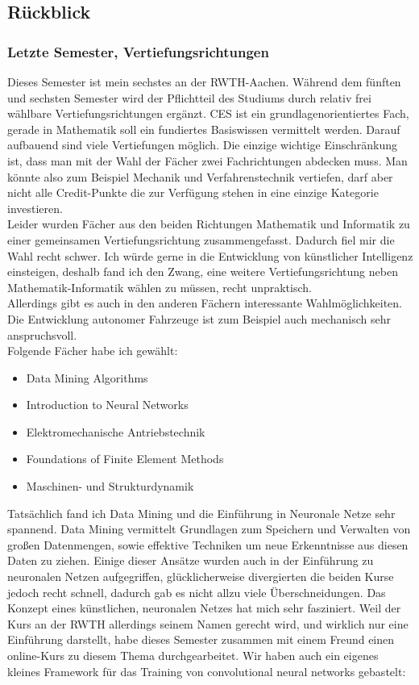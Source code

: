 \documentclass[12pt]{article}
\begin{document}
\begin{large}
\subsection*{Rückblick}
\subsubsection*{Letzte Semester, Vertiefungsrichtungen}
Dieses Semester ist mein sechstes an der RWTH-Aachen. Während dem fünften und sechsten Semester wird der Pflichtteil des Studiums durch relativ frei wählbare Vertiefungsrichtungen ergänzt. CES ist ein grundlagenorientiertes Fach, gerade in Mathematik soll ein fundiertes Basiswissen vermittelt werden. Darauf aufbauend sind viele Vertiefungen möglich. Die einzige wichtige Einschränkung ist, dass man mit der Wahl der Fächer zwei Fachrichtungen abdecken muss. Man könnte also zum Beispiel Mechanik und Verfahrenstechnik vertiefen, darf aber nicht alle Credit-Punkte die zur Verfügung stehen in eine einzige Kategorie investieren.\\
Leider wurden Fächer aus den beiden Richtungen Mathematik und Informatik zu einer gemeinsamen Vertiefungsrichtung zusammengefasst. Dadurch fiel mir die Wahl recht schwer.
Ich würde gerne in die Entwicklung von künstlicher Intelligenz einsteigen, deshalb fand ich den Zwang, eine weitere Vertiefungsrichtung neben Mathematik-Informatik wählen zu müssen, recht unpraktisch.\\
Allerdings gibt es auch in den anderen Fächern interessante Wahlmöglichkeiten. Die Entwicklung autonomer Fahrzeuge ist zum Beispiel auch mechanisch sehr anspruchsvoll.\\
Folgende Fächer habe ich gewählt:\\
\begin{itemize}
\item Data Mining Algorithms
\item Introduction to Neural Networks
\item Elektromechanische Antriebstechnik
\item Foundations of Finite Element Methods
\item Maschinen- und Strukturdynamik
\end{itemize}

Tatsächlich fand ich Data Mining und die Einführung in Neuronale Netze sehr spannend. Data Mining vermittelt Grundlagen zum Speichern und Verwalten von großen Datenmengen, sowie effektive Techniken um neue Erkenntnisse aus diesen Daten zu ziehen. Einige dieser Ansätze wurden auch in der Einführung zu neuronalen Netzen aufgegriffen, glücklicherweise divergierten die beiden Kurse jedoch recht schnell, dadurch gab es nicht allzu viele Überschneidungen. Das Konzept eines künstlichen, neuronalen Netzes hat mich sehr fasziniert. Weil der Kurs an der RWTH allerdings seinem Namen gerecht wird, und wirklich nur eine Einführung darstellt, habe dieses Semester zusammen mit einem Freund einen online-Kurs zu diesem Thema durchgearbeitet. Wir haben auch ein eigenes kleines Framework für das Training von convolutional neural networks gebastelt:


\end{large}
\end{document}
